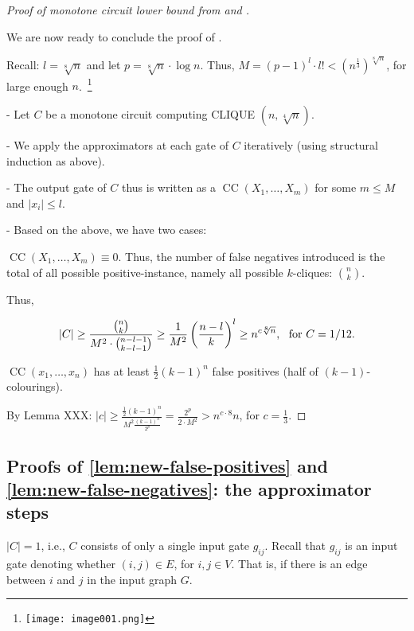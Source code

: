 \begin{proof}[Proof of  monotone circuit lower bound from  and ]
\begin{tcolorbox}[colframe=white, colback=blue!8, boxrule=0mm, sharp corners]
\end{tcolorbox}

We are now ready to conclude the proof of .

Recall: $l=\sqrt[8]{n}$ and
let $p=\sqrt[8]{n} \cdot \log n$. 
Thus, $M=(p-1)^l \cdot l!<\left(n^{\frac{1}{3}}\right)^{\sqrt[8]{n}}$, for large enough $n$.~\footnote{\texttt{[image: image001.png]}}



- Let $C$ be a monotone circuit computing CLIQUE $(n, \sqrt[4]{n})$.

- We apply the approximators at each gate of $C$ iteratively (using structural induction as above).

- The output gate of $C$ thus is written as a $\operatorname{CC}\left(X_1, \ldots, X_m\right)$ for some $m \leqslant M$ and $\left|x_i\right| \leqslant l$.

- Based on the above, we have two cases:

 $\operatorname{CC}\left(X_1, \ldots, X_m\right) \equiv 0$.
Thus, the number of false negatives introduced is the total of all possible positive-instance, namely all possible $k$-cliques: $\binom{n}{k}$.

Thus,

$$
|C| \geq \frac{\binom{n}{k}}{M^2\cdot\binom{n-l-1}{k-l-1}} \geq \frac{1}{M^2}\left(\frac{n-l}{k}\right)^l \geq n^{c \sqrt[8]{n}}, \text{~~for $C=1/12$.}
$$


 $\operatorname{CC}\left(x_1, \ldots, x_n\right)$ has at least $\frac{1}{2}(k-1)^n$ false positives (half of $(k-1)$-colourings).

By Lemma XXX: $|c| \geq \frac{\frac{1}{2}(k-1)^n}{M^2 \frac{(k-1)^n}{2^p}}=\frac{2^p}{2 \cdot M^2}>n^{c \cdot 8} n$, for $c=\frac{1}{3}$.
\end{proof}



\newpage{}


\subsection{Proofs of \cref{lem:new-false-positives} and \cref{lem:new-false-negatives}: the approximator steps}
 $|C|=1$, i.e., $C$ consists of only a single input gate $g_{ij}$. Recall that $g_{i j}$ is an input gate denoting whether $(i, j) \in E$, for $i, j \in V$.
That is, if there is an edge between $i$ and $j$ in the input graph $G$.

